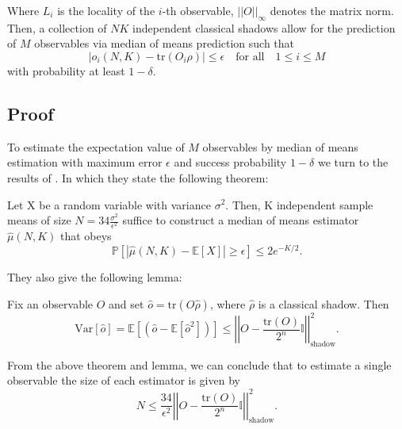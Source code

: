 \documentclass[12pt]{article}
\begin{document}
    Where $L_i$ is the locality of the $i$-th observable, $||O||_\infty$ denotes the matrix norm. Then, a collection of $NK$ independent classical shadows allow for the prediction of $M$ observables via median of means prediction such that
    \begin{equation*}
        |\hat{o}_i(N,K) - \text{tr}(O_i\rho)| \leq \epsilon \quad \text{for all} \quad 1 \leq i \leq M
    \end{equation*}
    with probability at least $1-\delta$.

    \subsection{Proof}
    To estimate the expectation value of $M$ observables by median of means estimation with maximum error $\epsilon$ and success probability $1-\delta$ we turn to the results of \cite{Huang_Kueng_Preskill_2020}. In which they state the following theorem:
    \begin{theorem}
        Let X be a random variable with variance $\sigma^2$. Then, K independent sample means of size $N = 34 \frac{\sigma^2}{\epsilon^2}$ suffice to construct a median of means estimator $\hat{\mu}(N, K)$ that obeys 
        \begin{equation}
            \mathbb{P}[|\hat{\mu}(N, K) - \mathbb{E}[X]| \geq \epsilon] \leq 2e^{-K/2}.
        \end{equation}
    \end{theorem}

    They also give the following lemma:
    \begin{lemma}
        Fix an observable $O$ and set $\hat{o} = \text{tr}(O\hat{\rho})$, where $\hat{\rho}$ is a classical shadow. Then
        \begin{equation}
            \text{Var}[\hat{o}] = \mathbb{E}\left[(\hat{o}-\mathbb{E}[\hat{o}^2])\right] \leq \left|\left| O - \frac{\text{tr}(O)}{2^n} \mathbb{I} \right|\right|^2_\text{shadow}.
        \end{equation}
    \end{lemma}

    From the above theorem and lemma, we can conclude that to estimate a single observable the size of each estimator is given by 
    \begin{equation}
        N \leq \frac{34}{\epsilon^2}\left|\left| O - \frac{\text{tr}(O)}{2^n} \mathbb{I} \right|\right|^2_\text{shadow}.
    \end{equation}
\end{document}
